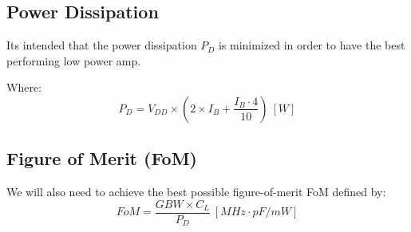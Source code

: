 \subsection{Power Dissipation}

Its intended that the power dissipation $P_D$ is minimized in order to have the best performing low power amp.

Where: 
\begin{equation}
    P_D = V_{DD} \times \left(2 \times I_B + \dfrac{I_B\cdot 4}{10}\right) \ [W]
    \label{eq:PD}
\end{equation}

\subsection{Figure of Merit (FoM)}
 We will also need to achieve the best possible figure-of-merit FoM defined by: 
\begin{equation}
    FoM = \frac{GBW \times C_L}{P_D} \ [MHz \cdot pF/mW]
    \label{eq:FoM}
\end{equation}
